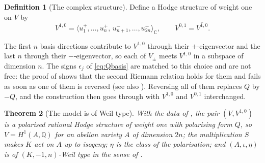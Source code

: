 \documentclass[11pt,reqno]{amsart}
\theoremstyle{plain}
\newtheorem{theorem}{Theorem}[section]
\theoremstyle{definition}
\newtheorem{definition}[theorem]{Definition}
\theoremstyle{remark}
\newcommand{\QQ}{\mathbb{Q}}
\newcommand{\CC}{\mathbb{C}}
\begin{document}
\begin{definition}[The complex structure]\label{def:modelHS}
Define a Hodge structure of weight one on $V$ by
\begin{equation}\label{eq:V10}
  V^{1,0}
  =\bigl\langle u_{1}^{+},\dots,u_{n}^{+},\,
      u_{n+1}^{-},\dots,u_{2n}^{-}\bigr\rangle_{\CC},
  \qquad
  V^{0,1}=\overline{V^{1,0}} .
\end{equation}
\end{definition}

The first $n$ basis directions contribute to $V^{1,0}$ through their
$+$-eigenvector and the last $n$ through their $-$-eigenvector, so each of
$V_{\pm}$ meets $V^{1,0}$ in a subspace of dimension $n$. The signs
$\epsilon_{j}$ of \eqref{eq:Qbasis} are matched to this choice and are not
free: the proof of  shows that the second Riemann relation
holds for them and fails as soon as one of them is reversed (see also
). Reversing all of them replaces $Q$ by $-Q$, and
the construction then goes through with $V^{1,0}$ and $V^{0,1}$ interchanged.

\begin{theorem}[The model is of Weil type]\label{thm:model}
With the data of , the pair $(V,V^{1,0})$ is a
polarised rational Hodge structure of weight one with polarising form $Q$, so
$V=H^{1}(A,\QQ)$ for an abelian variety $A$ of dimension $2n$; the
multiplication $S$ makes $K$ act on $A$ up to isogeny; $\eta$ is the class of
the polarisation; and $(A,\iota,\eta)$ is of $(K,-1,n)$-Weil type in the sense
of .
\end{theorem}
\end{document}
